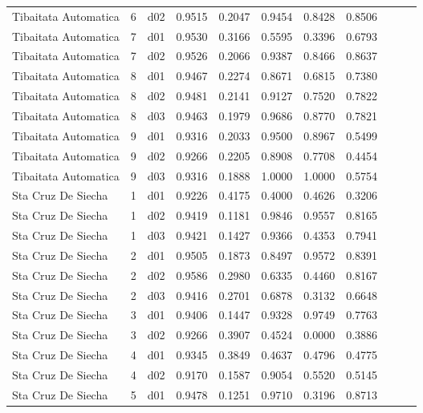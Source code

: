 \begin{landscape}
\begin{longtable}{p{5cm}rrrrrrrrrr}
 Tibaitata Automatica  & 6 &     d02 &   0.9515 &  0.2047 &    0.9454 &   0.8428 &    0.8506 \\
 Tibaitata Automatica  & 7 &     d01 &   0.9530 &  0.3166 &    0.5595 &   0.3396 &    0.6793 \\
 Tibaitata Automatica  & 7 &     d02 &   0.9526 &  0.2066 &    0.9387 &   0.8466 &    0.8637 \\
 Tibaitata Automatica  & 8 &     d01 &   0.9467 &  0.2274 &    0.8671 &   0.6815 &    0.7380 \\
 Tibaitata Automatica  & 8 &     d02 &   0.9481 &  0.2141 &    0.9127 &   0.7520 &    0.7822 \\
 Tibaitata Automatica  & 8 &     d03 &   0.9463 &  0.1979 &    0.9686 &   0.8770 &    0.7821 \\
 Tibaitata Automatica  & 9 &     d01 &   0.9316 &  0.2033 &    0.9500 &   0.8967 &    0.5499 \\
 Tibaitata Automatica  & 9 &     d02 &   0.9266 &  0.2205 &    0.8908 &   0.7708 &    0.4454 \\
 Tibaitata Automatica  & 9 &     d03 &   0.9316 &  0.1888 &    1.0000 &   1.0000 &    0.5754 \\
   Sta Cruz De Siecha  & 1 &     d01 &   0.9226 &  0.4175 &    0.4000 &   0.4626 &    0.3206 \\
   Sta Cruz De Siecha  & 1 &     d02 &   0.9419 &  0.1181 &    0.9846 &   0.9557 &    0.8165 \\
   Sta Cruz De Siecha  & 1 &     d03 &   0.9421 &  0.1427 &    0.9366 &   0.4353 &    0.7941 \\
   Sta Cruz De Siecha  & 2 &     d01 &   0.9505 &  0.1873 &    0.8497 &   0.9572 &    0.8391 \\
   Sta Cruz De Siecha  & 2 &     d02 &   0.9586 &  0.2980 &    0.6335 &   0.4460 &    0.8167 \\
   Sta Cruz De Siecha  & 2 &     d03 &   0.9416 &  0.2701 &    0.6878 &   0.3132 &    0.6648 \\
   Sta Cruz De Siecha  & 3 &     d01 &   0.9406 &  0.1447 &    0.9328 &   0.9749 &    0.7763 \\
   Sta Cruz De Siecha  & 3 &     d02 &   0.9266 &  0.3907 &    0.4524 &   0.0000 &    0.3886 \\
   Sta Cruz De Siecha  & 4 &     d01 &   0.9345 &  0.3849 &    0.4637 &   0.4796 &    0.4775 \\
   Sta Cruz De Siecha  & 4 &     d02 &   0.9170 &  0.1587 &    0.9054 &   0.5520 &    0.5145 \\
   Sta Cruz De Siecha  & 5 &     d01 &   0.9478 &  0.1251 &    0.9710 &   0.3196 &    0.8713 \\

\end{longtable}
\end{landscape}
